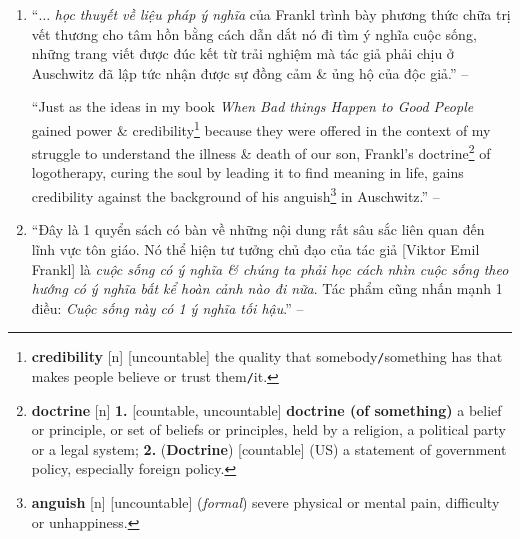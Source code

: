 \documentclass[oneside]{book}
\numberwithin{equation}{section}
\begin{document}
\begin{enumerate}[leftmargin=0mm]
	``I have known successful businessmen who, upon retirement, lost all zest\footnote{\textbf{zest} [n] \textbf{1.} [singular, uncountable] \textbf{zest (for something)} pleasure \& enthusiasm, \textsc{synonym}: \textbf{appetite}; \textbf{2.} [uncountable, singular] the quality of being exciting, interesting \& fun; \textbf{3.} [uncountable] the outer skin of an orange, a lemon, etc., when it is used in cooking.} for life. Their work had given their lives meaning. Often it was the only thing that gave their lives meaning, \& without it, they spent day after day sitting at home depressed, ``with nothing to do.'' I have known people who rose to the challenge of enduring the most terrible of afflictions\footnote{\textbf{affliction} [n] [uncountable, countable] (\textit{formal}) pain \& difficulty or something that causes it.} \& situations as long as they believed there was a point to their suffering. Whether it was a family milestone they wanted to live long enough to share or the prospect of doctors finding a cure by studying their affliction, having a Why to live for enabled them to bear the How.'' -- \cite[Preface by \textsc{Harold S. Kushner}, p. 10]{Frankl2013}
	\item ``$\ldots$ \textit{học thuyết về liệu pháp ý nghĩa} của Frankl trình bày phương thức chữa trị vết thương cho tâm hồn bằng cách dẫn dắt nó đi tìm ý nghĩa cuộc sống, những trang viết được đúc kết từ trải nghiệm mà tác giả phải chịu ở Auschwitz đã lập tức nhận được sự đồng cảm \& ủng hộ của độc giả.'' -- \cite[pp. 8--9]{Frankl2022}
	
	``Just as the ideas in my book \textit{When Bad things Happen to Good People} gained power \& credibility\footnote{\textbf{credibility} [n] [uncountable] the quality that somebody\texttt{/}something has that makes people believe or trust them\texttt{/}it.} because they were offered in the context of my struggle to understand the illness \& death of our son, Frankl's doctrine\footnote{\textbf{doctrine} [n] \textbf{1.} [countable, uncountable] \textbf{doctrine (of something)} a belief or principle, or set of beliefs or principles, held by a religion, a political party or a legal system; \textbf{2.} (\textbf{Doctrine}) [countable] (US) a statement of government policy, especially foreign policy.} of logotherapy, curing the soul by leading it to find meaning in life, gains credibility against the background of his anguish\footnote{\textbf{anguish} [n] [uncountable] (\textit{formal}) severe physical or mental pain, difficulty or unhappiness.} in Auschwitz.'' -- \cite[Preface by \textsc{Harold S. Kushner}, p. 10]{Frankl2013}
	\item ``Đây là 1 quyển sách có bàn về những nội dung rất sâu sắc liên quan đến lĩnh vực tôn giáo. Nó thể hiện tư tưởng chủ đạo của tác giả [Viktor Emil Frankl] là \textit{cuộc sống có ý nghĩa \& chúng ta phải học cách nhìn cuộc sống theo hướng có ý nghĩa bất kể hoàn cảnh nào đi nữa}. Tác phẩm cũng nhấn mạnh 1 điều: \textit{Cuộc sống này có 1 ý nghĩa tối hậu}.'' -- \cite[p. 9]{Frankl2022}
	

\end{enumerate}
\end{document}
